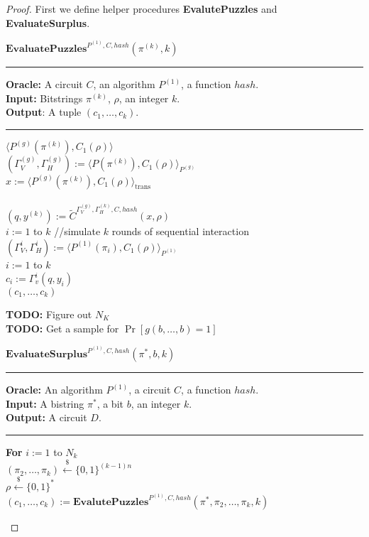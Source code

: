 \begin{proof}
First we define helper procedures \textbf{EvalutePuzzles} and \textbf{EvaluateSurplus}.
%
\begin{codeblock}
  $\textbf{EvaluatePuzzles}^{P^{(1)}, C, hash}(\pi^{(k)}, k)$
  \medskip \hrule \medskip
  \textbf{Oracle:}  A circuit $C$, an algorithm $P^{(1)}$, a function $hash$.\\
  \textbf{Input:} Bitstrings $\pi^{(k)}$, $\rho$, an integer $k$.\\
  \textbf{Output}: A tuple $(c_1, \dots, c_k)$.
  \medskip\hrule\medskip
  \Run $\langle P^{(g)}(\pi^{(k)}), C_1(\rho) \rangle$ \\
  \IndI $(\Gamma_V^{(g)}, \Gamma_H^{(g)}) := \langle P(\pi^{(k)}), C_1(\rho) \rangle_{P^{(g)}}$ \\
  \IndI $x := \langle P^{(g)}(\pi^{(k)}), C_1(\rho) \rangle_{\text{trans}}$ \\ \\
  $(q,y^{(k)}) := \widetilde{C}^{\Gamma_V^{(g)}, \Gamma_H^{(k)}, C, hash}(x, \rho)$\\
  \For $i:=1$ to $k$ \Do \IndII //simulate $k$ rounds of sequential interaction \\
  \IndI $(\Gamma_V^{i}, \Gamma_H^{i}) := \langle P^{(1)}(\pi_i), C_1(\rho) \rangle_{P^{(1)}} $\\
  \For $i:=1$ to $k$ \Do \\
  \IndI $c_i := \Gamma_v^{i}(q, y_i)$\\
  \return $(c_1, \dots, c_k)$
\end{codeblock}
%
\begin{todo}
  \textbf{TODO:} Figure out $N_K$\\
  \textbf{TODO:} Get a sample for $\Pr[g(b,\dots,b) = 1]$
\end{todo}
%
\begin{codeblock}
  $\textbf{EvaluateSurplus}^{P^{(1)}, C, hash}(\pi^*, b, k)$
  \medskip
  \hrule
  \medskip
  \textbf{Oracle:} An algorithm $P^{(1)}$, a circuit $C$, a function $hash$.\\
  \textbf{Input:} A bistring $\pi^*$, a bit $b$, an integer $k$.\\
  \textbf{Output:} A circuit $D$.
  \medskip\hrule\medskip
  \textbf{For} $i:=1$ to $N_k$ \Do \\
  \IndI $(\pi_2, \dots, \pi_k) \xleftarrow{\$} \{0,1\}^{(k-1)n}$\\
  \IndI $\rho \xleftarrow{\$} \{0,1\}^{*}$\\
  \IndI $(c_1, \dots, c_k) := \textbf{EvalutePuzzles}^{P^{(1)}, C, hash}(\pi^*, \pi_2, \dots, \pi_k, k)$\\

\end{codeblock}
\end{proof}
